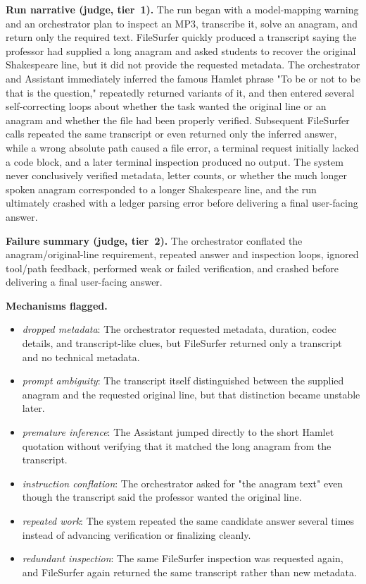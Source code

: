 \textbf{Run narrative (judge, tier~1).} The run began with a model-mapping warning and an orchestrator plan to inspect an MP3, transcribe it, solve an anagram, and return only the required text. FileSurfer quickly produced a transcript saying the professor had supplied a long anagram and asked students to recover the original Shakespeare line, but it did not provide the requested metadata. The orchestrator and Assistant immediately inferred the famous Hamlet phrase "To be or not to be that is the question," repeatedly returned variants of it, and then entered several self-correcting loops about whether the task wanted the original line or an anagram and whether the file had been properly verified. Subsequent FileSurfer calls repeated the same transcript or even returned only the inferred answer, while a wrong absolute path caused a file error, a terminal request initially lacked a code block, and a later terminal inspection produced no output. The system never conclusively verified metadata, letter counts, or whether the much longer spoken anagram corresponded to a longer Shakespeare line, and the run ultimately crashed with a ledger parsing error before delivering a final user-facing answer.

\textbf{Failure summary (judge, tier~2).} The orchestrator conflated the anagram/original-line requirement, repeated answer and inspection loops, ignored tool/path feedback, performed weak or failed verification, and crashed before delivering a final user-facing answer.

\textbf{Mechanisms flagged.}
\begin{itemize}
  \item \emph{dropped metadata}: The orchestrator requested metadata, duration, codec details, and transcript-like clues, but FileSurfer returned only a transcript and no technical metadata.
  \item \emph{prompt ambiguity}: The transcript itself distinguished between the supplied anagram and the requested original line, but that distinction became unstable later.
  \item \emph{premature inference}: The Assistant jumped directly to the short Hamlet quotation without verifying that it matched the long anagram from the transcript.
  \item \emph{instruction conflation}: The orchestrator asked for "the anagram text" even though the transcript said the professor wanted the original line.
  \item \emph{repeated work}: The system repeated the same candidate answer several times instead of advancing verification or finalizing cleanly.
  \item \emph{redundant inspection}: The same FileSurfer inspection was requested again, and FileSurfer again returned the same transcript rather than new metadata.
\end{itemize}

